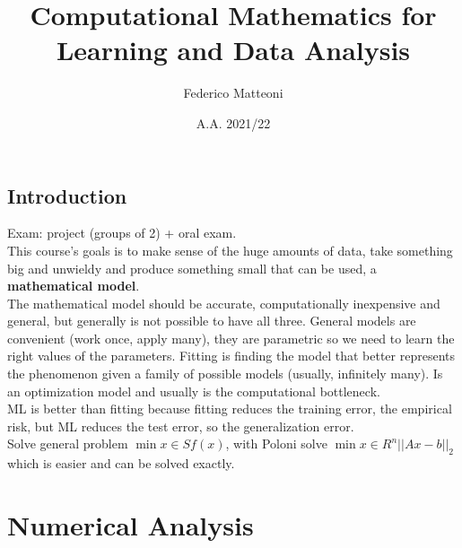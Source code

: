\documentclass[10pt]{report}
\begin{document}
\title{Computational Mathematics for Learning and Data Analysis}
\author{Federico Matteoni}
\date{A.A. 2021/22}
\renewcommand*\contentsname{Index}

\maketitle
\begin{multicols}{2}
\tableofcontents
\end{multicols}
\pagebreak
\section{Introduction}
Exam: project (groups of 2) + oral exam.\\
This course's goals is to make sense of the huge amounts of data, take something big and unwieldy and produce something small that can be used, a \textbf{mathematical model}.\\
The mathematical model should be accurate, computationally inexpensive and general, but generally is not possible to have all three. General models are convenient (work once, apply many), they are parametric so we need to learn the right values of the parameters. Fitting is finding the model that better represents the phenomenon given a family of possible models (usually, infinitely many). Is an optimization model and usually is the computational bottleneck.\\
ML is better than fitting because fitting reduces the training error, the empirical risk, but ML reduces the test error, so the generalization error.\\
Solve general problem $\min{x\in S}f(x)$, with Poloni solve $\min{x\in R^n}||Ax - b||_2$ which is easier and can be solved exactly.
\chapter{Numerical Analysis}
\end{document}
